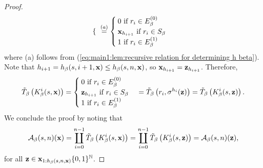 \begin{proof}
\begin{align}
\begin{cases}
        \end{cases} \overset{(a)}{=} \begin{cases}
            0 \text{ if } r_i \in E_\beta^{(0)}\\
            {\bf x}_{h_{i+1}}\text{ if } r_i \in S_\beta\\
            1 \text{ if } r_i \in E_\beta^{(1)}
        \end{cases}
    \end{align}
    where (a) follows from (\ref{eq:main1:lem:recursive relation for determining h beta}). Note that $h_{i+1} = h_\beta(s,i+1,{\bf x}) \leq h_\beta(s,n,{\bf x})$, so ${\bf x}_{h_{i+1}} = {\bf z}_{h_{i+1}}$. Therefore,
    \begin{align}
        \tilde T_\beta \left( K_\beta^i(s,{\bf x}) \right) = \begin{cases}
        0 \text{ if } r_i \in E_\beta^{(0)}\\
        {\bf z}_{h_{i+1}}\text{ if } r_i \in S_\beta\\
        1 \text{ if } r_i \in E_\beta^{(1)}
    \end{cases} = \tilde T_\beta \left(  r_i, \sigma^{h_i}({\bf z})\right) = \tilde T_\beta \left( K_\beta^i(s,{\bf z}) \right).
    \end{align}
    We conclude the proof by noting that 
    \begin{equation}
        \mathcal{A}_\beta(s,n)({\bf x}) = \coprod_{i=0}^{n-1} \tilde T_\beta \left( K_\beta^i(s,{\bf x}) \right) = \coprod_{i=0}^{n-1} \tilde T_\beta \left( K_\beta^i(s,{\bf z}) \right) = \mathcal{A}_\beta(s,n)({\bf z}),
    \end{equation}
    for all ${\bf z} \in {\bf x}_{1:h_\beta(s,n,{\bf x})}\{0,1\}^{\mathbb{N}}$.
\end{proof}

